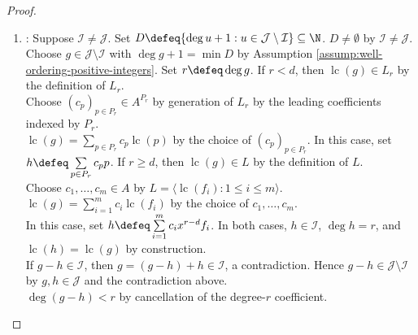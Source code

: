 \begin{theorem}
\begin{proof}
\begin{enumerate}[label=(\roman*)]
Choose finite generators of $L_k$ by its finite generation.\\
Each generator is a finite $A$-linear combination of those coefficients by Definition \ref{def:ideal-and-generated-ideal}(ii).\\
Let $P_k\subseteq\{p\in\mathcal{J}:\deg p=k\}$ be the corresponding finite polynomial set.\\
Then $L_k=\langle\operatorname{lc}(p):p\in P_k\rangle$ by the generator expansions and the definition of $L_k$.\\
Set $G\defeq\{f_1,\ldots,f_m\}\cup\bigcup\limits_{0\leq k<d}P_k$ and $\mathcal{I}\defeq\langle G\rangle\trianglelefteq A[x]$.\\
The set $G$ is finite by finiteness of the index range and each constituent. $\mathcal{I}\subseteq\mathcal{J}$ by Proposition \ref{prop:generated-ideal-smallest-containing-set}.
\item {}: Suppose $\mathcal{I}\neq\mathcal{J}$. Set $D\defeq\{\deg u+1:u\in\mathcal{J}\setminus\mathcal{I}\}\subseteq\N$. $D\neq\emptyset$ by $\mathcal{I}\neq\mathcal{J}$.\\
Choose $g\in\mathcal{J}\setminus\mathcal{I}$ with $\deg g+1=\min\limits D$ by Assumption \ref{assump:well-ordering-positive-integers}. Set $r\defeq\deg g$. If $r<d$, then $\operatorname{lc}(g)\in L_r$ by the definition of $L_r$.\\
Choose $(c_p)_{p\in P_r}\in A^{P_r}$ by generation of $L_r$ by the leading coefficients indexed by $P_r$.\\
$\operatorname{lc}(g)=\sum\limits_{p\in P_r}c_p\operatorname{lc}(p)$ by the choice of $(c_p)_{p\in P_r}$. In this case, set $h\defeq\sum\limits_{p\in P_r}c_pp$. If $r\geq d$, then $\operatorname{lc}(g)\in L$ by the definition of $L$.\\
Choose $c_1,\ldots,c_m\in A$ by $L=\langle\operatorname{lc}(f_i):1\leq i\leq m\rangle$. $\operatorname{lc}(g)=\sum\limits_{i=1}^{m}c_i\operatorname{lc}(f_i)$ by the choice of $c_1,\ldots,c_m$.\\
In this case, set $h\defeq\sum\limits_{i=1}^{m}c_ix^{r-d}f_i$. In both cases, $h\in\mathcal{I}$, $\deg h=r$, and $\operatorname{lc}(h)=\operatorname{lc}(g)$ by construction.\\
If $g-h\in\mathcal{I}$, then $g=(g-h)+h\in\mathcal{I}$, a contradiction. Hence $g-h\in\mathcal{J}\setminus\mathcal{I}$ by $g,h\in\mathcal{J}$ and the contradiction above.\\
$\deg(g-h)<r$ by cancellation of the degree-$r$ coefficient.\\

\end{enumerate}
\end{proof}
\end{theorem}
